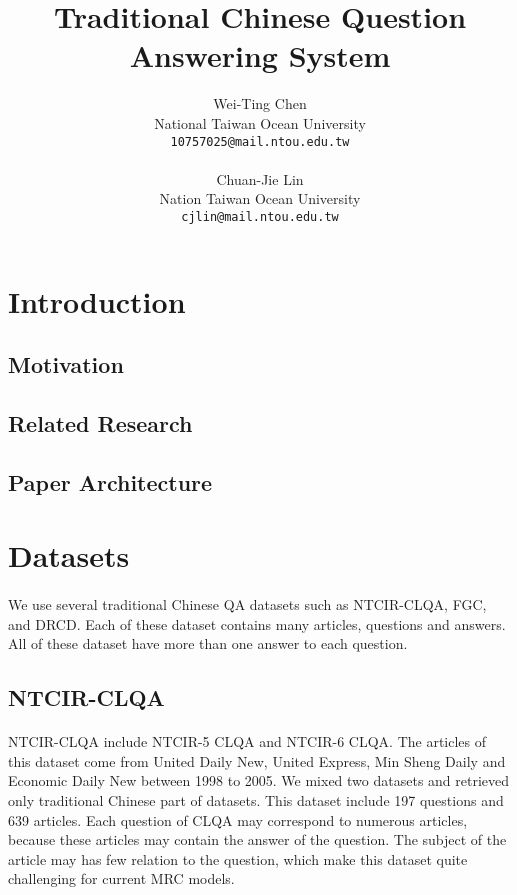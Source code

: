 \documentclass{article}
\title{Traditional Chinese Question Answering System}
\author{
  Wei-Ting Chen\\
  National Taiwan Ocean University\\
  \texttt{10757025@mail.ntou.edu.tw}\\
  \\
  Chuan-Jie Lin\\
  Nation Taiwan Ocean University\\
  \texttt{cjlin@mail.ntou.edu.tw}\\
}
\begin{document}
\maketitle
{}
\newpage
{}
\doublespacing
\tableofcontents
\singlespacing
\newpage

\section{Introduction}

\subsection{Motivation}

\subsection{Related Research}

\subsection{Paper Architecture}

\section{Datasets}
\paragraph{}
We use several traditional Chinese QA datasets such as NTCIR-CLQA, FGC, and DRCD. Each of these dataset contains many articles, questions and answers. All of these dataset have more than one answer to each question.

\subsection{NTCIR-CLQA}
\paragraph{}
NTCIR-CLQA include NTCIR-5 CLQA\cite{sasaki2005ntcir5} and NTCIR-6\cite{sasaki2005ntcir6} CLQA. The articles of this dataset come from United Daily New, United Express, Min Sheng Daily and Economic Daily New between 1998 to 2005. We mixed two datasets and retrieved only traditional Chinese part of datasets. This dataset include 197 questions and 639 articles. Each question of CLQA may correspond to numerous articles, because these articles may contain the answer of the question. The subject of the article may has few relation to the question, which make this dataset quite challenging for current MRC models.
\end{document}
